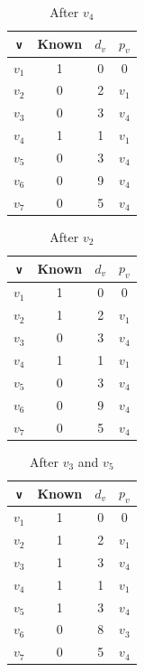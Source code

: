 \begin{minipage}{0.33\textwidth}
\begin{table}[H]
  \centering
  \begin{tabular}{c|c|c|c}
      \toprule
      \verb|v| & Known & \(d_v\) & \(p_v\)  \\
    \midrule
      \(v_1\) & 1 & 0 & 0  \\
      \(v_2\) & 0 & 2 & \(v_1\)  \\
      \(v_3\) & 0 & 3 & \(v_4\)  \\
      \(v_4\) & 1 & 1 & \(v_1\)  \\
      \(v_5\) & 0 & 3 & \(v_4\)  \\
      \(v_6\) & 0 & 9 & \(v_4\)  \\
      \(v_7\) & 0 & 5 & \(v_4\)  \\
    \bottomrule
  \end{tabular}
  \caption*{After \(v_4\)}
\end{table}
\end{minipage}
\begin{minipage}{0.33\textwidth}
\begin{table}[H]
  \centering
  \begin{tabular}{c|c|c|c}
      \toprule
      \verb|v| & Known & \(d_v\) & \(p_v\)  \\
    \midrule
      \(v_1\) & 1 & 0 & 0  \\
      \(v_2\) & 1 & 2 & \(v_1\)  \\
      \(v_3\) & 0 & 3 & \(v_4\)  \\
      \(v_4\) & 1 & 1 & \(v_1\)  \\
      \(v_5\) & 0 & 3 & \(v_4\)  \\
      \(v_6\) & 0 & 9 & \(v_4\)  \\
      \(v_7\) & 0 & 5 & \(v_4\)  \\
    \bottomrule
  \end{tabular}
  \caption*{After \(v_2\)}
\end{table}
\end{minipage}
\begin{minipage}{0.33\textwidth}
  \begin{table}[H]
    \centering
    \begin{tabular}{c|c|c|c}
        \toprule
        \verb|v| & Known & \(d_v\) & \(p_v\)  \\
      \midrule
        \(v_1\) & 1 & 0 & 0  \\
        \(v_2\) & 1 & 2 & \(v_1\)  \\
        \(v_3\) & 1 & 3 & \(v_4\)  \\
        \(v_4\) & 1 & 1 & \(v_1\)  \\
        \(v_5\) & 1 & 3 & \(v_4\)  \\
        \(v_6\) & 0 & 8 & \(v_3\)  \\
        \(v_7\) & 0 & 5 & \(v_4\)  \\
      \bottomrule
    \end{tabular}
    \caption*{After \(v_3\) and \(v_5\)}
  \end{table}
\end{minipage}

